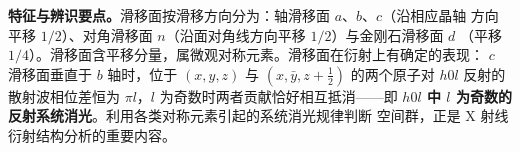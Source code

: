 \textbf{特征与辨识要点。}滑移面按滑移方向分为：轴滑移面 $a$、$b$、$c$（沿相应晶轴
方向平移 $1/2$）、对角滑移面 $n$（沿面对角线方向平移 $1/2$）与金刚石滑移面 $d$
（平移 $1/4$）。滑移面含平移分量，属微观对称元素。滑移面在衍射上有确定的表现：
$c$ 滑移面垂直于 $b$ 轴时，位于 $(x,y,z)$ 与 $(x,\bar y,z+\tfrac12)$ 的两个原子对
$h0l$ 反射的散射波相位差恒为 $\pi l$，$l$ 为奇数时两者贡献恰好相互抵消——即
\textbf{$h0l$ 中 $l$ 为奇数的反射系统消光}。利用各类对称元素引起的系统消光规律判断
空间群，正是 X 射线衍射结构分析的重要内容。
